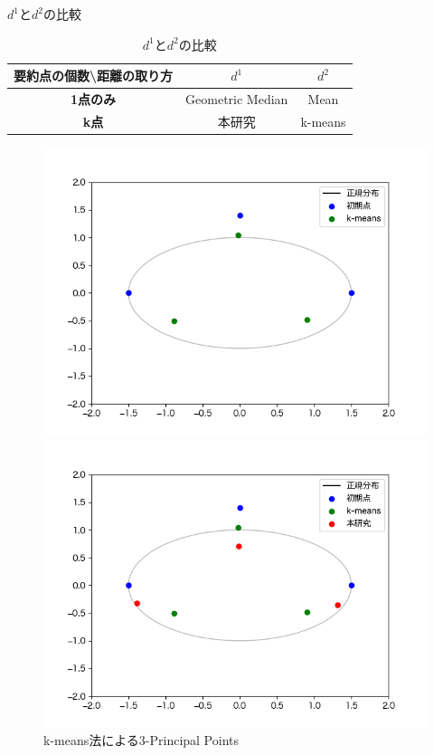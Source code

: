 \documentclass[unicode,11pt]{beamer}
\begin{document}
\begin{frame}{$d^1$と$d^2$の比較}
    \begin{table}[ht]
        \centering
        \begin{tabular}{|c|c|c|}
            \hline
            要約点の個数\textbackslash 距離の取り方& \textbf{$d^1$} & \textbf{$d^2$} \\
            \hline
            \textbf{1点のみ} & Geometric Median & Mean \\
            \hline
            \textbf{k点} & 本研究 & k-means \\
            \hline
        \end{tabular}
        \caption{$d^1$と$d^2$の比較}
        \label{tab:comparison}
    \end{table}
    \begin{figure}[htbp]
        \begin{minipage}[b]{0.48\linewidth}
            \centering
            \includegraphics[keepaspectratio, scale=0.30]{Nontitlek-meansonly.png}
            \caption{k-means法による3-Principal Points}
        \end{minipage}
        \begin{minipage}[b]{0.45\linewidth}
            \centering
            \includegraphics[keepaspectratio, scale=0.30]{Nontitlek-meansandmedian.png}

\end{minipage}
\end{figure}
\end{frame}
\end{document}
